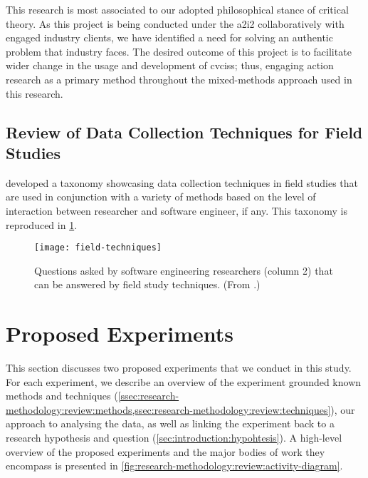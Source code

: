 This research is most associated to our adopted philosophical stance of critical theory. As this project is being conducted under the \gls{a2i2} collaboratively with engaged industry clients, we have identified a need for solving an authentic problem that industry faces. The desired outcome of this project is to facilitate wider change in the usage and development of \glspl{cvcis}; thus, engaging action research as a primary method throughout the mixed-methods approach used in this research.

\subsection{Review of Data Collection Techniques for Field Studies}
\label{ssec:research-methodology:review:techniques}

\citeauthor{Singer:2007tu} developed a taxonomy \citep{Singer:2007tu,Lethbridge:2005jv} showcasing data collection techniques in field studies that are used in conjunction with a variety of methods based on the level of interaction between researcher and software engineer, if any. This taxonomy is reproduced in \cref{fig:research-methodology:review:field-techniques}.

\begin{figure}[p!]
\centering
\caption[Review of field study techniques]{Questions asked by software engineering researchers (column 2) that can be answered by field study techniques. (From \citep{Singer:2007tu}.)}
\label{fig:research-methodology:review:field-techniques}
\texttt{[image: field-techniques]}
\end{figure}


\section{Proposed Experiments}
\label{sec:research-methodology:experiments}

This section discusses two proposed experiments that we conduct in this study. For each experiment, we describe an overview of the experiment grounded known methods and techniques (\cref{ssec:research-methodology:review:methods,ssec:research-methodology:review:techniques}), our approach to analysing the data, as well as linking the experiment back to a research hypothesis and question (\cref{sec:introduction:hypohtesis}). A high-level overview of the proposed experiments and the major bodies of work they encompass is presented in \cref{fig:research-methodology:review:activity-diagram}.

